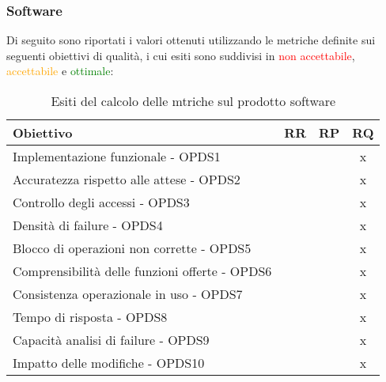 \documentclass[PdQ.tex]{subfiles}
\begin{document}
	\subsubsection{Software}
	Di seguito sono riportati i valori ottenuti utilizzando le metriche definite sui seguenti obiettivi di qualità, i cui esiti sono suddivisi in \textcolor{red}{non accettabile}, \textcolor{orange}{accettabile} e \textcolor{green}{ottimale}:
	\begin{table}[h]
				\centering
				\begin{tabular}{l c c c}
					\hline
					\rule[-0.3cm]{0cm}{0.8cm}
					\textbf{Obiettivo} & \textbf{RR} & \textbf{RP} & \textbf{RQ}\\
					\hline
					\rule[0cm]{0cm}{0.4cm}
					Implementazione funzionale - OPDS1 & & & x \\
					\rule[0cm]{0cm}{0.4cm}
					Accuratezza rispetto alle attese - OPDS2 & & & x \\
					\rule[0cm]{0cm}{0.4cm}
					Controllo degli accessi - OPDS3 & & & x \\
					\rule[0cm]{0cm}{0.4cm}
					Densità di failure - OPDS4 & & & x \\
					\rule[0cm]{0cm}{0.4cm}
					Blocco di operazioni non corrette - OPDS5 & & & x \\
					\rule[0cm]{0cm}{0.4cm}
					Comprensibilità delle funzioni offerte - OPDS6 & & & x \\
					\rule[0cm]{0cm}{0.4cm}
					Consistenza operazionale in uso - OPDS7 & & & x \\
					\rule[0cm]{0cm}{0.4cm}
					Tempo di risposta - OPDS8 & & & x \\
					\rule[0cm]{0cm}{0.4cm}
					Capacità analisi di failure - OPDS9 & & & x \\
					\rule[0cm]{0cm}{0.4cm}
					Impatto delle modifiche - OPDS10 & & & x \\
					\hline
				\end{tabular}
				\caption{Esiti del calcolo delle mtriche sul prodotto software}
			\end{table}		
\end{document}
